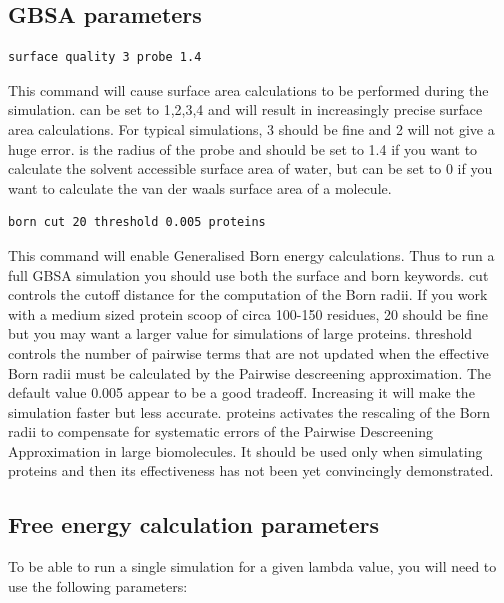\documentclass[letterpaper,10pt,english]{sphinxmanual}
\begin{document}
\subsection{GBSA parameters}
\label{protoms:gbsa-parameters}
\begin{Verbatim}[frame=single,commandchars=\\\{\}]
surface quality 3 probe 1.4
\end{Verbatim}

This command will cause surface area calculations to be performed during the simulation.  can be set to 1,2,3,4 and will result in increasingly precise surface area calculations. For typical simulations, 3 should be fine and 2 will not give a huge error.  is the radius of the probe and should be set to 1.4 if you want to calculate the solvent accessible surface area of water, but can be set to 0 if you want to calculate the van der waals surface area of a molecule.

\begin{Verbatim}[frame=single,commandchars=\\\{\}]
born cut 20 threshold 0.005 proteins
\end{Verbatim}

This command will enable Generalised Born energy calculations. Thus to run a full GBSA simulation you should use both the surface and born keywords. cut controls the cutoff distance for the computation of the Born radii. If you work with a medium sized protein scoop of circa 100-150 residues, 20 should be fine but you may want a larger value for simulations of large proteins. threshold controls the number of pairwise terms that are not updated when the effective Born radii must be calculated by the Pairwise descreening approximation. The default value
0.005 appear to be a good tradeoff. Increasing it will make the simulation faster but less accurate. proteins activates the rescaling of the Born radii to compensate for systematic errors of the Pairwise Descreening Approximation in large biomolecules. It should be used only when simulating proteins and then its effectiveness has not been yet
convincingly demonstrated.


\subsection{Free energy calculation parameters}
\label{protoms:free-energy-calculation-parameters}
To be able to run a single simulation for a given lambda value, you will need to use the following parameters:
\end{document}
